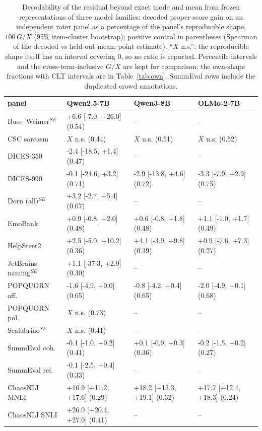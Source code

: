 \begin{table}[t]\centering\footnotesize
\caption{Decodability of the residual beyond exact mode and mean from frozen representations of three model families: decoded proper-score gain on an independent rater panel as a percentage of the panel's reproducible shape, $100\,G/X$ (95\% item-cluster bootstrap); positive control in parentheses (Spearman of the decoded vs held-out mean; point estimate). ``$X$ n.s.'': the reproducible shape itself has an interval covering 0, so no ratio is reported. Percentile intervals and the cross-term-inclusive $G/X$ are kept for comparison; the own-shape fractions with CLT intervals are in Table~\ref{tab:own}. SummEval rows include the duplicated crowd annotations.}\label{tab:decode}
\begin{tabular}{llll}\toprule panel & Qwen2.5-7B & Qwen3-8B & OLMo-2-7B \\\midrule
Buse--Weimer$^{SE}$ & +6.6 [-7.0, +26.0] (0.54) & -- & -- \\
CSC sarcasm & $X$ n.s. (0.44) & $X$ n.s. (0.51) & $X$ n.s. (0.52) \\
DICES-350 & -2.4 [-18.5, +1.4] (0.47) & -- & -- \\
DICES-990 & -0.1 [-24.6, +3.2] (0.71) & -2.9 [-13.8, +4.6] (0.72) & -3.3 [-7.9, +2.9] (0.75) \\
Dorn (all)$^{SE}$ & +3.2 [-2.7, +5.4] (0.67) & -- & -- \\
EmoBank & +0.9 [-0.8, +2.0] (0.48) & +0.6 [-0.8, +1.8] (0.48) & +1.1 [-1.0, +1.7] (0.49) \\
HelpSteer2 & +2.5 [-5.0, +10.2] (0.36) & +4.1 [-3.9, +9.8] (0.39) & +0.9 [-7.6, +7.3] (0.27) \\
JetBrains naming$^{SE}$ & +1.1 [-37.3, +2.9] (0.30) & -- & -- \\
POPQUORN off. & -1.6 [-4.9, +0.0] (0.65) & -0.8 [-4.2, +0.4] (0.65) & -2.0 [-4.9, +0.1] (0.68) \\
POPQUORN pol. & $X$ n.s. (0.73) & -- & -- \\
Scalabrino$^{SE}$ & $X$ n.s. (0.41) & -- & -- \\
SummEval coh. & -0.1 [-1.0, +0.2] (0.41) & +0.1 [-0.9, +0.3] (0.36) & -0.2 [-1.5, +0.2] (0.27) \\
SummEval rel. & -0.1 [-2.5, +0.4] (0.33) & -- & -- \\
ChaosNLI MNLI & +16.9 [+11.2, +17.6] (0.29) & +18.2 [+13.3, +19.1] (0.32) & +17.7 [+12.4, +18.3] (0.24) \\
ChaosNLI SNLI & +26.0 [+20.4, +27.0] (0.41) & -- & -- \\
\bottomrule\end{tabular}\end{table}